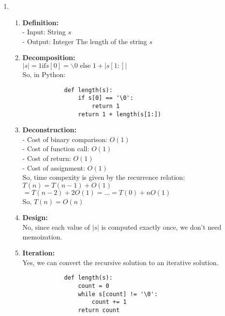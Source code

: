 \documentclass[a4paper]{article}
\begin{document}
\begin{enumerate}
    \newpage
    \item \begin{enumerate}
        \item \textbf{Definition:} \\
        - Input: String $s$ \\
        - Output: Integer The length of the string $s$ \\

        \item \textbf{Decomposition:} \\
        $|s| = 1 \text{if} s[0] = \backslash 0 \text{ else } 1 + |s[1:]|$ \\

        So, in Python:
        \lstset{language=Python}
        \begin{lstlisting}
            def length(s):
                if s[0] == '\0':
                    return 1
                return 1 + length(s[1:])
        \end{lstlisting}

        \item \textbf{Deconstruction:} \\
        - Cost of binary comparison: $O(1)$ \\
        - Cost of function call: $O(1)$ \\
        - Cost of return: $O(1)$ \\
        - Cost of assignment: $O(1)$ \\

        So, time compexity is given by the recurrence relation: $T(n) = T(n-1) + O(1)$ \\
        $ = T(n-2) + 2O(1) = \dots = T(0) + nO(1)$ \\
        So, $T(n) = O(n)$ \\

        \item \textbf{Design:} \\
        No, since each value of $|s|$ is computed exactly once, we don't need memoization. \\

        \item \textbf{Iteration:} \\
        Yes, we can convert the recursive solution to an iterative solution.
        \lstset{language=Python}
        \begin{lstlisting}
            def length(s):
                count = 0
                while s[count] != '\0':
                    count += 1
                return count
        \end{lstlisting}


\end{enumerate}
\end{enumerate}
\end{document}

